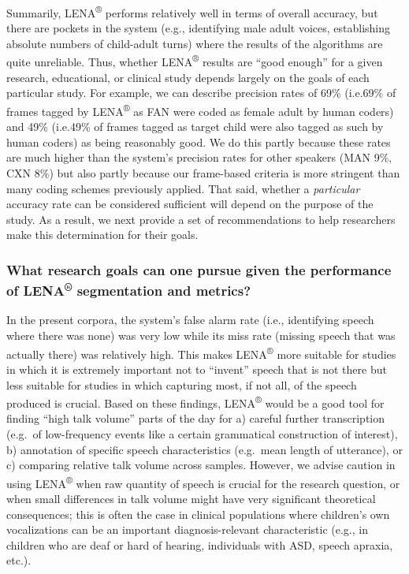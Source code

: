 \documentclass[english,floatsintext,man]{apa6}
\begin{document}
Summarily, LENA\textsuperscript{®} performs relatively well in terms of
overall accuracy, but there are pockets in the system (e.g., identifying
male adult voices, establishing absolute numbers of child-adult turns)
where the results of the algorithms are quite unreliable. Thus, whether
LENA\textsuperscript{®} results are \enquote{good enough} for a given
research, educational, or clinical study depends largely on the goals of
each particular study. For example, we can describe precision rates of
69\% (i.e.69\% of frames tagged by LENA\textsuperscript{®} as FAN were
coded as female adult by human coders) and 49\% (i.e.49\% of frames
tagged as target child were also tagged as such by human coders) as
being reasonably good. We do this partly because these rates are much
higher than the system's precision rates for other speakers (MAN 9\%,
CXN 8\%) but also partly because our frame-based criteria is more
stringent than many coding schemes previously applied. That said,
whether a \emph{particular} accuracy rate can be considered sufficient
will depend on the purpose of the study. As a result, we next provide a
set of recommendations to help researchers make this determination for
their goals.

\subsubsection{\texorpdfstring{What research goals can one pursue given
the performance of LENA\textsuperscript{®} segmentation and
metrics?}{What research goals can one pursue given the performance of LENA® segmentation and metrics?}}\label{what-research-goals-can-one-pursue-given-the-performance-of-lena-segmentation-and-metrics}

In the present corpora, the system's false alarm rate (i.e., identifying
speech where there was none) was very low while its miss rate (missing
speech that was actually there) was relatively high. This makes
LENA\textsuperscript{®} more suitable for studies in which it is
extremely important not to \enquote{invent} speech that is not there but
less suitable for studies in which capturing most, if not all, of the
speech produced is crucial. Based on these findings,
LENA\textsuperscript{®} would be a good tool for finding \enquote{high
talk volume} parts of the day for a) careful further transcription
(e.g.~of low-frequency events like a certain grammatical construction of
interest), b) annotation of specific speech characteristics (e.g.~mean
length of utterance), or c) comparing relative talk volume across
samples. However, we advise caution in using LENA\textsuperscript{®}
when raw quantity of speech is crucial for the research question, or
when small differences in talk volume might have very significant
theoretical consequences; this is often the case in clinical populations
where children's own vocalizations can be an important
diagnosis-relevant characteristic (e.g., in children who are deaf or
hard of hearing, individuals with ASD, speech apraxia, etc.).
\end{document}
